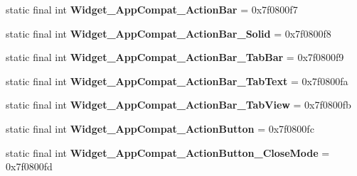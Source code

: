 \begin{DoxyCompactItemize}
\item 
\hypertarget{classandroid_1_1support_1_1v7_1_1appcompat_1_1_r_1_1style_af9ccaa30f85b041b6f0c7f5077795979}{}static final int {\bfseries Widget\+\_\+\+App\+Compat\+\_\+\+Action\+Bar} = 0x7f0800f7\label{classandroid_1_1support_1_1v7_1_1appcompat_1_1_r_1_1style_af9ccaa30f85b041b6f0c7f5077795979}

\item 
\hypertarget{classandroid_1_1support_1_1v7_1_1appcompat_1_1_r_1_1style_a05dee95ca4a31058f1e8749708f4e244}{}static final int {\bfseries Widget\+\_\+\+App\+Compat\+\_\+\+Action\+Bar\+\_\+\+Solid} = 0x7f0800f8\label{classandroid_1_1support_1_1v7_1_1appcompat_1_1_r_1_1style_a05dee95ca4a31058f1e8749708f4e244}

\item 
\hypertarget{classandroid_1_1support_1_1v7_1_1appcompat_1_1_r_1_1style_a631483194eb7110b33fa5158287a2e5d}{}static final int {\bfseries Widget\+\_\+\+App\+Compat\+\_\+\+Action\+Bar\+\_\+\+Tab\+Bar} = 0x7f0800f9\label{classandroid_1_1support_1_1v7_1_1appcompat_1_1_r_1_1style_a631483194eb7110b33fa5158287a2e5d}

\item 
\hypertarget{classandroid_1_1support_1_1v7_1_1appcompat_1_1_r_1_1style_a577669ac1cf782a721001fe744374741}{}static final int {\bfseries Widget\+\_\+\+App\+Compat\+\_\+\+Action\+Bar\+\_\+\+Tab\+Text} = 0x7f0800fa\label{classandroid_1_1support_1_1v7_1_1appcompat_1_1_r_1_1style_a577669ac1cf782a721001fe744374741}

\item 
\hypertarget{classandroid_1_1support_1_1v7_1_1appcompat_1_1_r_1_1style_a22b55f7cb4073c4b1890d22d27af414b}{}static final int {\bfseries Widget\+\_\+\+App\+Compat\+\_\+\+Action\+Bar\+\_\+\+Tab\+View} = 0x7f0800fb\label{classandroid_1_1support_1_1v7_1_1appcompat_1_1_r_1_1style_a22b55f7cb4073c4b1890d22d27af414b}

\item 
\hypertarget{classandroid_1_1support_1_1v7_1_1appcompat_1_1_r_1_1style_a604fa2bfad530b840478f9ca70decb84}{}static final int {\bfseries Widget\+\_\+\+App\+Compat\+\_\+\+Action\+Button} = 0x7f0800fc\label{classandroid_1_1support_1_1v7_1_1appcompat_1_1_r_1_1style_a604fa2bfad530b840478f9ca70decb84}

\item 
\hypertarget{classandroid_1_1support_1_1v7_1_1appcompat_1_1_r_1_1style_acffc9b830cdc90b6caf36cbc82f002a2}{}static final int {\bfseries Widget\+\_\+\+App\+Compat\+\_\+\+Action\+Button\+\_\+\+Close\+Mode} = 0x7f0800fd\label{classandroid_1_1support_1_1v7_1_1appcompat_1_1_r_1_1style_acffc9b830cdc90b6caf36cbc82f002a2}


\end{DoxyCompactItemize}
